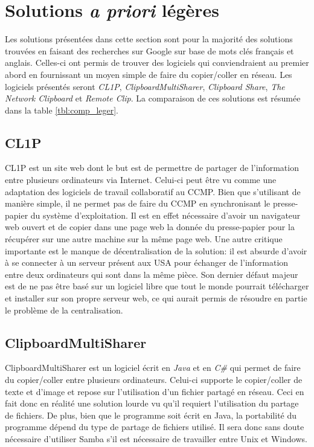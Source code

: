 \section{Solutions \emph{a priori} légères}
Les solutions présentées dans cette section sont pour la majorité des
solutions trouvées en faisant des recherches sur Google sur base
de mots clés français et anglais. Celles-ci ont permis de trouver des
logiciels qui conviendraient au premier abord en fournissant un moyen
simple de faire du copier/coller en réseau. Les logiciels présentés seront
\emph{CL1P}, \emph{ClipboardMultiSharer}, \emph{Clipboard Share},
\emph{The Network Clipboard} et \emph{Remote Clip}.
La comparaison de ces solutions est résumée dans la table \ref{tbl:comp_leger}.

\subsection{CL1P}
CL1P\cite{cl1p} est un site web dont le but est de permettre de partager
de l'information entre plusieurs ordinateurs via Internet. Celui-ci
peut être vu comme une adaptation des logiciels de travail collaboratif au
CCMP. Bien que s'utilisant de manière simple, il ne permet pas de faire du
CCMP en synchronisant le presse-papier du système d'exploitation. Il est en
effet nécessaire d'avoir un navigateur web ouvert et de copier dans une page
web la donnée du presse-papier pour la récupérer sur une autre machine
sur la même page web. Une autre critique importante est le manque de
décentralisation de la solution: il est absurde d'avoir à se connecter à un
serveur présent aux USA pour échanger de l'information entre deux
ordinateurs qui sont dans la même pièce. Son dernier défaut majeur est de
ne pas être basé sur un logiciel libre que tout le monde pourrait télécharger
et installer sur son propre serveur web, ce qui aurait permis de résoudre
en partie le problème de la centralisation.

\subsection{ClipboardMultiSharer}
ClipboardMultiSharer \cite{clipmsharer} est un logiciel écrit en \emph{Java}
et en \emph{C\#} qui permet de faire du copier/coller entre plusieurs
ordinateurs. Celui-ci supporte le copier/coller de texte et d'image et repose
sur l'utilisation d'un fichier partagé en réseau. Ceci en fait donc en réalité
une solution lourde vu qu'il requiert l'utilisation du partage de fichiers.
De plus, bien que le programme soit écrit en Java, la portabilité du programme
dépend du type de partage de fichiers utilisé. Il sera donc sans doute
nécessaire d'utiliser Samba s'il est nécessaire de travailler entre Unix
et Windows.

